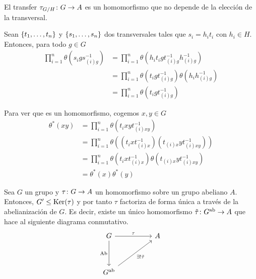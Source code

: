 
\begin{proposicion}
	El transfer $\tau_{G/ H}\colon G\to A$ es un homomorfismo que no depende de la elección de la transversal.
	\begin{demostracion}
		Sean  $\{t_1,\ldots,t_n\}$ y  $\{s_1,\ldots,s_n\}$ dos transversales tales que $s_i = h_it_i$ con $h_i\in H$. Entonces, para todo $g\in G$
		\begin{align*}
			\prod_{i=1}^n \theta\left(s_igs_{(i)g}^{-1}\right) 
			&= \prod_{i=1}^n \theta\left(h_it_igt_{(i)g}^{-1}h_{(i)g}^{-1}\right) \\
			&= \prod_{i=1}^n \theta\left(t_igt_{(i)g}^{-1}\right)\theta\left(h_ih_{(i)g}^{-1}\right)\\
			&=\prod_{i=1}^n \theta\left(t_igt_{(i)g}^{-1}\right) 
		\end{align*}

		Para ver que es un homomorfismo, cogemos $x,y\in G$
		\begin{align*}
			\theta^*(xy) &= \prod_{i=1}^n \theta\left(t_ixyt_{(i)xy}^{-1}\right) \\
			&=  \prod_{i=1}^n \theta\left((t_ixt_{(i)x}^{-1})(t_{(i)x}yt_{(i)xy}^{-1})\right) \\
			&= \prod_{i=1}^n \theta\left(t_ixt_{(i)x}^{-1}\right)\theta\left(t_{(i)x}yt_{(i)xy}^{-1}\right)\\
			&= \theta^*(x)\theta^*(y)
		\end{align*}
	\end{demostracion}
\end{proposicion}

\begin{observacion}
	Sea $G$ un grupo y $\tau\colon G\to A$ un homomorfismo sobre un grupo abeliano $A$. Entonces, $G' \leq \operatorname{Ker}(\tau)$ y por tanto $\tau$ factoriza de forma única a través de la abelianización de $G$. Es decir, existe un único homomorfismo $\tilde\tau\colon G^\text{ab}\to A $ que hace al siguiente diagrama conmutativo.
\[\begin{tikzcd}
	G && A \\
	\\
	{\Ab G}
	\arrow["\tau", from=1-1, to=1-3]
	\arrow["\AbFunctor"', from=1-1, to=3-1]
	\arrow["{\exists!\tilde\tau}"', from=3-1, to=1-3]
\end{tikzcd}\]
\end{observacion}

